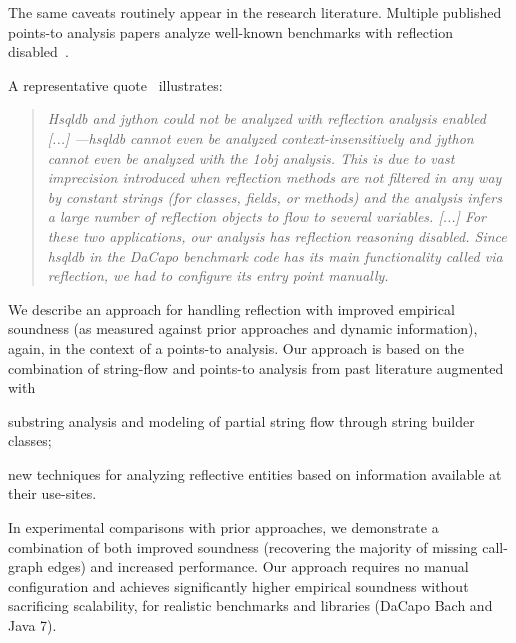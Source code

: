 \documentclass{llncs}
\begin{document}
\noindent The same caveats routinely appear in the research
literature. Multiple published points-to analysis papers analyze
well-known benchmarks with reflection
disabled~\cite{popl/SmaragdakisBL11,pldi/KastrinisS13,ecoop/AliL12,ecoop/AliL13}.


A representative quote~\cite{popl/SmaragdakisBL11} illustrates:
\begin{quote}
  \emph{Hsqldb and jython could not be analyzed with reflection
    analysis enabled [...]  ---hsqldb cannot even be analyzed
    context-insensitively and jython cannot even be analyzed with the
    1obj analysis. This is due to vast imprecision introduced when
    reflection methods are not filtered in any way by constant strings
    (for classes, fields, or methods) and the analysis infers a large
    number of reflection objects to flow to several variables.  [...]
    For these two applications, our analysis has reflection reasoning
    disabled.  Since hsqldb in the DaCapo benchmark code has its main
    functionality called via reflection, we had to configure its entry
    point manually.}
\end{quote}

\noindent
We describe an approach for handling reflection with improved empirical
soundness (as measured against prior approaches and dynamic
information), again, in the context of a points-to analysis. Our
approach is based on the combination of string-flow and points-to
analysis from past literature augmented with
\begin{inparaenum}[(a)]
\item substring analysis and modeling of partial string flow through
  string builder classes;
\item new techniques for analyzing reflective entities based on
  information available at their use-sites.
\end{inparaenum}
In experimental comparisons with prior approaches, we demonstrate a
combination of both improved soundness (recovering the majority of
missing call-graph edges) and increased performance.
%
Our approach requires no manual configuration and achieves
significantly higher empirical soundness without sacrificing
scalability, for realistic benchmarks and libraries (DaCapo Bach and
Java 7).
\end{document}
